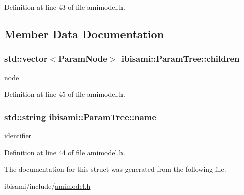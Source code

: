 Definition at line 43 of file amimodel.\+h.



\subsection{Member Data Documentation}
\hypertarget{structibisami_1_1_param_tree_a512771aaec7a303ebcafd7c66812dd7f}{}
\subsubsection[{children}]{\setlength{\rightskip}{0pt plus 5cm}std\+::vector$<${\bf Param\+Node}$>$ ibisami\+::\+Param\+Tree\+::children}\label{structibisami_1_1_param_tree_a512771aaec7a303ebcafd7c66812dd7f}


node 



Definition at line 45 of file amimodel.\+h.

\hypertarget{structibisami_1_1_param_tree_a6776eb67c955420e87360ed764bc5cf3}{}
\subsubsection[{name}]{\setlength{\rightskip}{0pt plus 5cm}std\+::string ibisami\+::\+Param\+Tree\+::name}\label{structibisami_1_1_param_tree_a6776eb67c955420e87360ed764bc5cf3}


identifier 



Definition at line 44 of file amimodel.\+h.



The documentation for this struct was generated from the following file\+:\begin{DoxyCompactItemize}
\item 
ibisami/include/\hyperlink{amimodel_8h}{amimodel.\+h}\end{DoxyCompactItemize}
